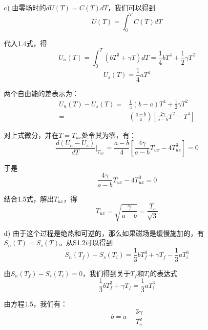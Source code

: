 c) 由零场时的$dU(T)=C(T)dT$，我们可以得到
\begin{equation*}
U(T) =\int_{0}^{T}C(T) dT  \tag{S1.12}
\end{equation*}

代入1.4式，得
\begin{equation*}
U_n(T) =\int_{0}^{T}(bT^3 +\gamma T)dT = \frac{1}{4}bT^4 +\frac{1}{2}\gamma T^2 \tag{S1.13a}
\end{equation*}
\begin{equation*}
U_s(T)=\frac{1}{4}aT^4 \tag{S1.13b}
\end{equation*}

两个自由能的差表示为：
\begin{equation*}
\begin{split}
U_n(T) − U_s(T) =&\frac{1}{4} (b − a)T^4 + \frac{1}{2}\gamma T^2\\
=&\left(\frac{a-b}{4}\right)\left[\frac{2\gamma}{a-b}T^2-T^4\right]
\end{split} \tag{S1.14}
\end{equation*}

对上式微分，并在$T=T_{ux}$处令其为零，有：
\begin{equation*}
\frac{d(U_n-U_s)}{dT}|_{T_{ux}}=\frac{a-b}{4} \left[\frac{4\gamma}{a-b}T_{ux}-4T_{ux}^3\right]=0 \tag{S1.15}
\end{equation*}

于是
\begin{equation*}
\frac{4\gamma}{a-b}T_{ux}-4T_{ux}^3=0 \tag{S1.16}
\end{equation*}

结合1.5式，解出$T_{ux}$，得
\begin{equation*}
T_{ux}=\sqrt{\frac{\gamma}{a-b}}=\frac{T_c}{\sqrt{3}} \tag{1.9}
\end{equation*}

d) 由于这个过程是绝热和可逆的，那么如果磁场是缓慢施加的，有$S_n(T)=S_s(T)$。从S1.2可以得到
\begin{equation*}
S_n(T_f ) − S_s(T_i) =\frac{1}{3}bT_f^3 +\gamma T_f −\frac{1}{3}aT_i^3 \tag{S1.17}
\end{equation*}

由$S_n(T_f )−S_s(T_i)=0$，我们得到关于$T_f$和$T_i$的表达式
\begin{equation*}
\frac{1}{3}bT_f^3 +\gamma T_f =\frac{1}{3}aT_i^3 \tag{S1.18}
\end{equation*}

由方程1.5，我们有：
\begin{equation*}
b = a − \frac{3\gamma}{T_c^2} \tag{S1.19}
\end{equation*}

